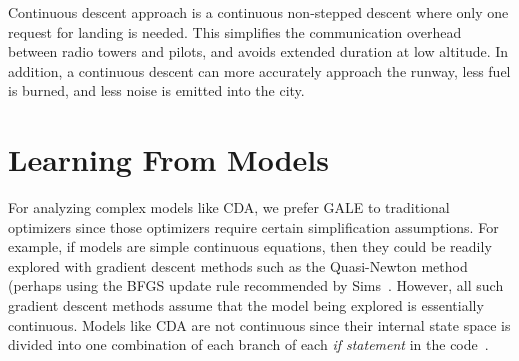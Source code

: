 \documentclass[journal]{IEEEtran}
\begin{document}
Continuous descent approach is a continuous non-stepped descent
where only one request for landing is needed.  
This simplifies the communication overhead between radio towers and pilots, and 
avoids extended duration at low altitude.  
In addition, a continuous descent can more accurately approach the runway, less fuel is burned, and less noise is emitted into the city.  

 





\section{Learning From Models}\label{sec:lfm}


For analyzing complex models like CDA, we prefer GALE to traditional  optimizers since those optimizers require certain simplification assumptions.
For example, if models are simple continuous equations, then they could be readily explored with gradient descent methods such as the Quasi-Newton method (perhaps using the BFGS update rule recommended by Sims~\cite{Sims10}.
However, all such gradient descent methods assume that the model being explored is essentially continuous. 
Models like CDA are not continuous since their internal state space is divided
into one  combination of each branch of each {\em if statement} in the code~\cite{Davies2012}.
\end{document}

